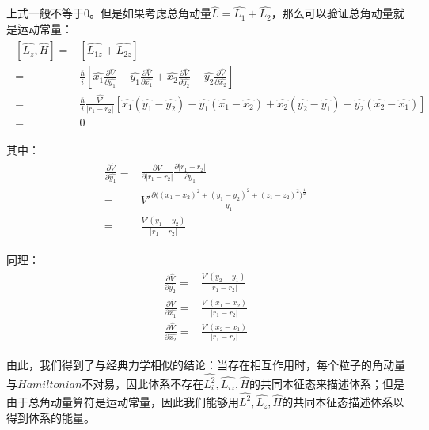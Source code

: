    上式一般不等于0。但是如果考虑总角动量$\hat{L}=\hat{L_1}+\hat{L_2}$，那么可以验证总角动量就是运动常量：
    \begin{align}
        \begin{split}
            [\hat{L_z},\hat{H}]=&[\hat{L_{1z}}+\hat{L_{2z}}]\\
            =&\frac{\hbar}{i}[\hat{x_1}\frac{\partial \hat{V}}{\partial \hat{y_1}}-\hat{y_1}\frac{\partial \hat{V}}{\partial \hat{x_1}}+\hat{x_2}\frac{\partial \hat{V}}{\partial \hat{y_2}}-\hat{y_2}\frac{\partial \hat{V}}{\partial \hat{x_2}}]\\
            =&\frac{\hbar}{i}\frac{\hat{V'}}{|r_1-r_2|}[\hat{x_1}(\hat{y_1}-\hat{y_2})-\hat{y_1}(\hat{x_1}-\hat{x_2})+\hat{x_2}(\hat{y_2}-\hat{y_1})-\hat{y_2}(\hat{x_2}-\hat{x_1})]\\
            =&0
        \end{split}
    \end{align}
    
    其中：
    \begin{align}
        \begin{split}
            \frac{\partial \hat{V}}{\partial \hat{y_1}}=&\frac{\partial V}{\partial|r_1-r_2|}\frac{\partial|r_1-r_2|}{\partial y_1}\\
            =&V'\frac{\partial \Big((x_1-x_2)^2+(y_1-y_2)^2+(z_1-z_2)^2\Big)^{\frac{1}{2}} }{y_1}\\
            =&\frac{V'(y_1-y_2)}{|r_1-r_2|}
        \end{split}
    \end{align}
    
    同理：
    \begin{align}
        \begin{split}
            \frac{\partial \hat{V}}{\partial \hat{y_2}}=&\frac{V'(y_2-y_1)}{|r_1-r_2|}\\
            \frac{\partial \hat{V}}{\partial \hat{x_1}}=&\frac{V'(x_1-x_2)}{|r_1-r_2|}\\
            \frac{\partial \hat{V}}{\partial \hat{x_2}}=&\frac{V'(x_2-x_1)}{|r_1-r_2|}
        \end{split}
    \end{align}
    
    由此，我们得到了与经典力学相似的结论：当存在相互作用时，每个粒子的角动量与$Hamiltonian$不对易，因此体系不存在$\hat{L_i^2},\hat{L_{iz}},\hat{H}$的共同本征态来描述体系；但是由于总角动量算符是运动常量，因此我们能够用$\hat{L^2},\hat{L_z},\hat{H}$的共同本征态描述体系以得到体系的能量。
    
